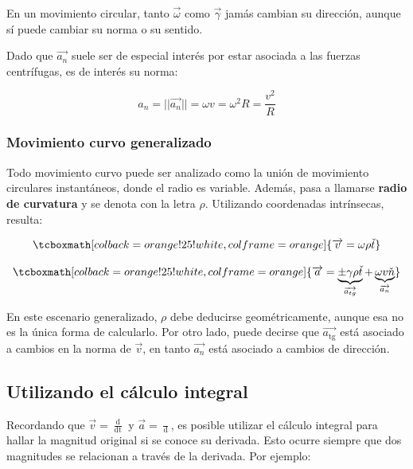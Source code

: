 \documentclass{article}
\begin{document}
En un movimiento circular, tanto $\overrightarrow{\omega}$ como $\overrightarrow{\gamma}$ jamás cambian su dirección, aunque sí puede cambiar su norma o su sentido.

Dado que $\overrightarrow{a_n}$ suele ser de especial interés por estar asociada a las fuerzas centrífugas, es de interés su norma:

\begin{equation}
a_n = ||\overrightarrow{a_n}|| = \omega v = \omega^2 R = \frac{v^2}{R}
\end{equation}

\subsubsection{Movimiento curvo generalizado}

Todo movimiento curvo puede ser analizado como la unión de movimiento circulares instantáneos, donde el radio es variable. Además, pasa a llamarse \textbf{radio de curvatura} y se denota con la letra $\rho$. Utilizando coordenadas intrínsecas, resulta:

\begin{equation}
\tcboxmath[colback=orange!25!white,colframe=orange]{
\overrightarrow{v} = \omega \rho \check{t}
}
\end{equation}

\begin{equation}
\tcboxmath[colback=orange!25!white,colframe=orange]{
\overrightarrow{a} = \underbrace{ \pm \gamma \rho \check{t} }_{\overrightarrow{a_{\mathop{tg}}}} + \underbrace{ \omega v \check{n} }_{\overrightarrow{a_n}}
}
\end{equation}

En este escenario generalizado, $\rho$ debe deducirse geométricamente, aunque esa no es la única forma de calcularlo. Por otro lado, puede decirse que $\overrightarrow{a_{\mathop{tg}}}$ está asociado a cambios en la norma de $\overrightarrow{v}$, en tanto $\overrightarrow{a_n}$ está asociado a cambios de dirección.

\subsection{Utilizando el cálculo integral}

Recordando que $\overrightarrow{v} = \frac{ \mathop{d \overrightarrow{r}} }{ \mathop{dt} }$ y $\overrightarrow{a} = \frac{ \mathop{d^2 \overrightarrow{r}} }{ \mathop{dt^2} }$, es posible utilizar el cálculo integral para hallar la magnitud original si se conoce su derivada. Esto ocurre siempre que dos magnitudes se relacionan a través de la derivada. Por ejemplo:
\end{document}
